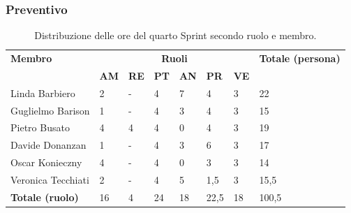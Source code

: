 \subsubsection{Preventivo}
\begin{table}[ht!]
	\centering
	\begin{tabular}{p{4cm} p{1cm} p{1cm} p{1cm} p{1cm} p{1cm} p{1cm} p{3cm}}
		\toprule
        \textbf{Membro} & \multicolumn{6}{c}{\textbf{Ruoli}} & \textbf{Totale (persona)}\\
		& \textbf{AM} & \textbf{RE} & \textbf{PT} & \textbf{AN} & \textbf{PR} & \textbf{VE}\\
		\midrule
        Linda Barbiero          & 2     & -     & 4     & 7     & 4     & 3     & 22 \\
        Guglielmo Barison       & 1     & -     & 4     & 3     & 4     & 3     & 15\\
        Pietro Busato           & 4     & 4     & 4     & 0     & 4     & 3     & 19 \\
        Davide Donanzan         & 1     & -     & 4     & 3     & 6     & 3     & 17 \\
        Oscar Konieczny         & 4     & -     & 4     & 0     & 3     & 3     & 14 \\
        Veronica Tecchiati      & 2     & -     & 4     & 5     & 1,5   & 3     & 15,5 \\
        \bottomrule
        \textbf{Totale (ruolo)} & 16    & 4     & 24    & 18    & 22,5  & 18   & 100,5 \\
	\end{tabular}
	\caption{Distribuzione delle ore del quarto Sprint secondo ruolo e membro.}
	\label{table:Distribuzione delle ore del quarto Sprint secondo ruolo e membro}
\end{table}
